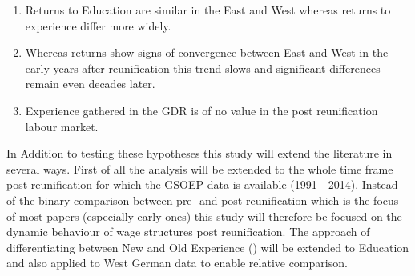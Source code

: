 \begin{enumerate}
	\item Returns to Education are similar in the East and West whereas returns to experience differ more widely. 
	\item Whereas returns show signs of convergence between East and West in the early years after reunification this trend slows and significant differences remain even decades later.
	\item Experience gathered in the GDR is of no value in the post reunification labour market.
\end{enumerate}

In Addition to testing these hypotheses this study will extend the literature in several ways. First of all the analysis will be extended to the whole time frame post reunification for which the GSOEP data is available (1991 - 2014). Instead of the binary comparison between pre- and post reunification which is the focus of most papers (especially early ones) this study will therefore be focused on the dynamic behaviour of wage structures post reunification. The approach of differentiating between New and Old Experience (\cite{gathmann_understanding_2004}) will be extended to Education and also applied to West German data to enable relative comparison. 


